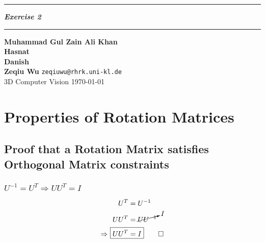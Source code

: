 \documentclass{article}
\newcommand{\squishlist}{
 \begin{list}{$\bullet$}
  { \setlength{\itemsep}{0pt}
     \setlength{\parsep}{3pt}
     \setlength{\topsep}{3pt}
     \setlength{\partopsep}{0pt}
     \setlength{\leftmargin}{1.5em}
     \setlength{\labelwidth}{1em}
     \setlength{\labelsep}{0.5em} } }
\newcommand{\squishend}{
  \end{list}  }
\begin{document}
 \def\maketitle{%
 \thispagestyle{plain}
 \vspace{-10ex}
 \hrule
 \bigskip
 \begin{center}
 {\Large{\textbf{\@title}}}
 \end{center}
 \bigskip
 \hrule

 \bigskip

 \begin{flushleft}
 \textbf{\normalsize{Muhammad Gul Zain Ali Khan}} 
 \\
 \vspace{5pt}
 \textbf{\normalsize{Hasnat}} 
 \\
 \vspace{5pt}
 \textbf{\normalsize{Danish}}
 \\
\vspace{5pt}
 \textbf{\normalsize{Zeqiu Wu}} \hfill \texttt{zeqiuwu@rhrk.uni-kl.de}
 \\
 \vspace{5pt}
 3D Computer Vision \vspace{5pt}
\hfill \today \\ 
 \end{flushleft}
 }
\def\title#1{\def\@title{#1}}
\title{\textit{Exercise 2}}



\maketitle

\section{Properties of Rotation Matrices}
\subsection{Proof that a Rotation Matrix satisfies Orthogonal Matrix constraints}
\subsubsection*{$U^{-1} = U^{T} \Rightarrow UU^{T} = I$}
\begin{alignat}{2}
\nonumber
U^{T} &= U^{-1} \\
\nonumber
UU^{T} &= \cancelto{I}{UU^{-1}} \\
\Rightarrow ~ \Aboxed{UU^{T} &= I} \qed \label{eq:e1}
\end{alignat}
\end{document}
